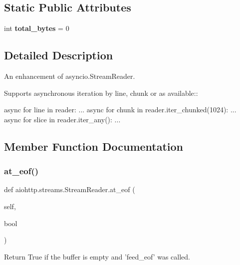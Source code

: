 \subsection*{Static Public Attributes}
\begin{DoxyCompactItemize}
\item 
\mbox{\label{classaiohttp_1_1streams_1_1_stream_reader_a0b8cdc9f842297c2062b9a917c99a93f}} 
int {\bfseries total\+\_\+bytes} = 0
\end{DoxyCompactItemize}


\subsection{Detailed Description}
\begin{DoxyVerb}An enhancement of asyncio.StreamReader.

Supports asynchronous iteration by line, chunk or as available::

    async for line in reader:
        ...
    async for chunk in reader.iter_chunked(1024):
        ...
    async for slice in reader.iter_any():
        ...\end{DoxyVerb}
 

\subsection{Member Function Documentation}
\mbox{\label{classaiohttp_1_1streams_1_1_stream_reader_af3938f65cfa3d79989f2336cb96aceb9}} 
\subsubsection{\texorpdfstring{at\+\_\+eof()}{at\_eof()}}
{\footnotesize\ttfamily def aiohttp.\+streams.\+Stream\+Reader.\+at\+\_\+eof (\begin{DoxyParamCaption}\item[{}]{self,  }\item[{}]{bool }\end{DoxyParamCaption})}

\begin{DoxyVerb}Return True if the buffer is empty and 'feed_eof' was called.\end{DoxyVerb}
 \mbox{\label{classaiohttp_1_1streams_1_1_stream_reader_acdc51e6cf2a77ee82a0dbb4cd07996e2}} 
